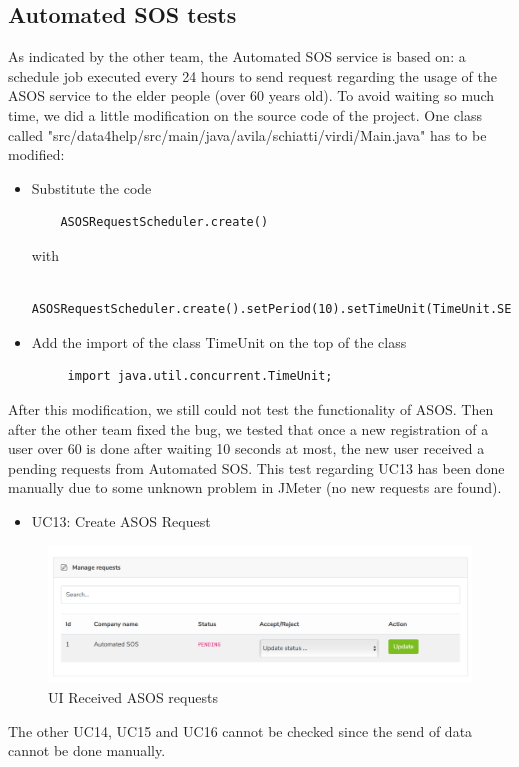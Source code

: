 \subsection{Automated SOS tests}
As indicated by the other team, the Automated SOS service is based on: a schedule job executed every 24 hours to send request regarding the usage of the ASOS service to the elder people (over 60 years old). To avoid waiting so much time, we did a little modification on the source code of the project. One class called "src/data4help/src/main/java/avila/schiatti/virdi/Main.java" has to be modified:
\begin{itemize}
\item Substitute the code
\begin{verbatim}
	ASOSRequestScheduler.create()
\end{verbatim}
with
\begin{verbatim}
	ASOSRequestScheduler.create().setPeriod(10).setTimeUnit(TimeUnit.SECONDS)
\end{verbatim}
\item Add the import of the class TimeUnit on the top of the class
\begin{verbatim}
	 import java.util.concurrent.TimeUnit;
\end{verbatim}
\end{itemize}
After this modification, we still could not test the functionality of ASOS. Then after the other team fixed the bug, we tested that once a new registration of a user over 60 is done after waiting 10 seconds at most, the new user received a pending requests from Automated SOS. This test regarding UC13 has been done manually due to some unknown problem in JMeter (no new requests are found). 
\begin{itemize}
\item UC13: Create ASOS Request
\end{itemize}

\begin{figure}[H]
\includegraphics[width=\linewidth]{images/pendingASOS}
\caption{ UI Received ASOS requests }
\label{fig:asosrequest}
\end{figure}

The other UC14, UC15 and UC16 cannot be checked since the send of data cannot be done manually.
